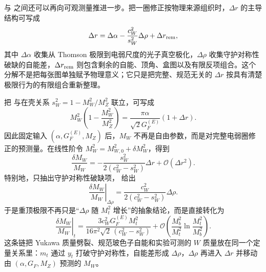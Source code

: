  与 之间还可以再向可观测量推进一步。把一圈修正按物理来源组织时，$\Delta r$ 的主导结构可写成
\begin{equation}
{
\Delta r
=\Delta\alpha
-\frac{c_W^2}{s_W^2}\Delta\rho
+\Delta r_{\rm rem},}
\label{eq:sm-deltar-decomposition-dp95}
\end{equation}
其中 $\Delta\alpha$ 收集从 Thomson 极限到电弱尺度的光子真空极化，$\Delta\rho$ 收集守护对称性破缺的自能差，$\Delta r_{\rm rem}$ 则包含剩余的自能、顶角、盒图以及有限反项组合。这个分解不是把每张图单独赋予物理意义；它只是把完整、规范无关的 $\Delta r$ 按具有清楚极限行为的有限组合重新整理。

把 与在壳关系 $s_W^2=1-M_W^2/M_Z^2$ 联立，可写成
\begin{equation}
{
M_W^2\left(1-\frac{M_W^2}{M_Z^2}\right)
=\frac{\pi\alpha}{\sqrt2G_F^{(E)}}(1+\Delta r).}
\label{eq:sm-mw-deltar-relation-dp95}
\end{equation}
因此固定输入 $(\alpha,G_F^{(E)},M_Z)$ 后，$M_W$ 不再是自由参数，而是对完整电弱圈修正的预测量。在线性阶令 $M_W^2=M_{W,0}^2+\delta M_W^2$，得到
\begin{equation}
{
\frac{\delta M_W}{M_W}
=-\frac{s_W^2}{2(c_W^2-s_W^2)}\Delta r
+\mathcal O(\Delta r^2).}
\label{eq:sm-mw-linear-response-dp95}
\end{equation}
特别地，只抽出守护对称性破缺项， 给出
\begin{equation}
{
\left.\frac{\delta M_W}{M_W}\right|_{\Delta\rho}
=\frac{c_W^2}{2(c_W^2-s_W^2)}\Delta\rho.}
\label{eq:sm-mw-rho-response-dp95}
\end{equation}
于是重顶极限不再只是“$\Delta\rho$ 随 $M_t^2$ 增长”的抽象结论，而是直接转化为
\begin{equation}
\left.\frac{\delta M_W}{M_W}\right|_{t}
=\frac{3c_W^2G_F^{(E)}M_t^2}
{16\pi^2\sqrt2\,(c_W^2-s_W^2)}
+\mathcal O\!\left(\frac{M_b^2}{M_t^2}\ln\frac{M_t^2}{M_b^2}\right).
\label{eq:sm-mw-top-response-dp95}
\end{equation}
这条链把 Yukawa 质量劈裂、规范玻色子自能和实验可测的 $W$ 质量放在同一个定量关系里：$m_t$ 通过 $y_t$ 打破守护对称性，自能差形成 $\Delta\rho$，$\Delta\rho$ 再进入 $\Delta r$ 并移动由 $(\alpha,G_F,M_Z)$ 预测的 $M_W$。
